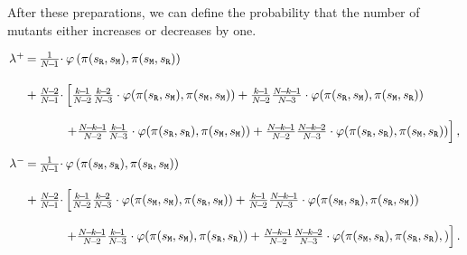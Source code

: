 \documentclass[11pt]{article}
\def\resident{\texttt{R}}
\def\mutant{\texttt{M}}
\def\strategy{s}
\theoremstyle{plainCl1}
\theoremstyle{plainCl2}
\begin{document}
\noindent
After these preparations, we can define the probability that the number of
mutants either increases or decreases by one.

\begin{equation*}
  \setlength{\arraycolsep}{1pt} 
  \begin{array}{llll}
    \lambda^+	 &=
  &\frac{1}{N\!-\!1}\cdot  & \varphi\left(\pi (\strategy_\resident, \strategy_\mutant), \pi (\strategy_\mutant, \strategy_\resident)\right)\\[0.5cm]
  &+
  &\frac{N\!-\!2}{N\!-\!1} \cdot 
  &\left[ \frac{k\!-\!1}{N\!-\!2}\frac{k\!-\!2}{N\!-\!3}\cdot \varphi(\pi (\strategy_\resident, \strategy_\mutant), \pi (\strategy_\mutant, \strategy_\mutant)) + 
   \frac{k\!-\!1}{N\!-\!2}\frac{N\!-\!k\!-\!1}{N\!-\!3}\cdot \varphi(\pi (\strategy_\resident, \strategy_\mutant), \pi (\strategy_\mutant, \strategy_\resident)) \right.\\[0.5cm]
  &&&\left. +\frac{N\!-\!k\!-\!1}{N\!-\!2}\frac{k\!-\!1}{N\!-\!3} \cdot \varphi(\pi (\strategy_\resident, \strategy_\resident), \pi (\strategy_\mutant, \strategy_\mutant)) + 
   \frac{N\!-\!k\!-\!1}{N\!-\!2}\frac{N\!-\!k\!-\!2}{N\!-\!3} \cdot \varphi(\pi (\strategy_\resident, \strategy_\resident), \pi (\strategy_\mutant, \strategy_\resident))\right],
  \end{array}
\end{equation*}

\begin{equation*}
  \setlength{\arraycolsep}{1pt} 
  \begin{array}{llll}
    \lambda^-	 &=
  &\frac{1}{N\!-\!1}\cdot  & \varphi\left(\pi (\strategy_\mutant, \strategy_\resident), \pi(\strategy_\resident, \strategy_\mutant)\right)\\[0.5cm]
  &+
  &\frac{N\!-\!2}{N\!-\!1} \cdot 
  &\left[ \frac{k\!-\!1}{N\!-\!2}\frac{k\!-\!2}{N\!-\!3}\cdot \varphi(\pi(\strategy_\mutant, \strategy_\mutant), \pi(\strategy_\resident, \strategy_\mutant)) + 
   \frac{k\!-\!1}{N\!-\!2}\frac{N\!-\!k\!-\!1}{N\!-\!3}\cdot \varphi(\pi(\strategy_\mutant, \strategy_\resident), \pi(\strategy_\resident, \strategy_\mutant)) \right.\\[0.5cm]
  &&&\left. +\frac{N\!-\!k\!-\!1}{N\!-\!2}\frac{k\!-\!1}{N\!-\!3} \cdot \varphi(\pi(\strategy_\mutant, \strategy_\mutant), \pi(\strategy_\resident, \strategy_\resident)) + 
   \frac{N\!-\!k\!-\!1}{N\!-\!2}\frac{N\!-\!k\!-\!2}{N\!-\!3} \cdot \varphi(\pi(\strategy_\mutant, \strategy_\resident), \pi(\strategy_\resident, \strategy_\resident),)\right].
  \end{array}
\end{equation*}
\end{document}

